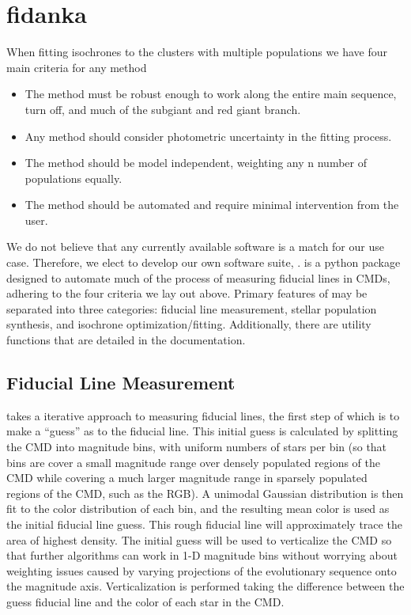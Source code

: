 \section{fidanka}\label{sec:fidanka}
When fitting isochrones to the clusters with multiple populations we have four
main criteria for any method

\begin{itemize}
  \item The method must be robust enough to work along the entire main
    sequence, turn off, and much of the subgiant and red giant branch.
	\item Any method should consider photometric uncertainty in the fitting process.
	\item The method should be model independent, weighting any n number of populations equally.
	\item The method should be automated and require minimal intervention from the user.
\end{itemize}


We do not believe that any currently available software is a match for
our use case. Therefore, we elect to develop our own software suite, \fidanka.
\fidanka is a python package designed to automate much of the process of
measuring fiducial lines in CMDs, adhering to the four criteria we lay out
above. Primary features of \fidanka may be separated into three
categories: fiducial line measurement, stellar population synthesis, and
isochrone optimization/fitting. Additionally, there are utility functions that
are detailed in the \fidanka documentation.

\subsection{Fiducial Line Measurement}
\fidanka takes a iterative approach to measuring fiducial lines, the first step
of which is to make a ``guess'' as to the fiducial line. This initial guess
is calculated by splitting the CMD into magnitude bins, with uniform numbers of
stars per bin (so that bins are cover a small magnitude range over densely
populated regions of the CMD while covering a much larger magnitude range in
sparsely populated regions of the CMD, such as the RGB). A unimodal Gaussian
distribution is then fit to the color distribution of each bin, and the
resulting mean color is used as the initial fiducial line guess. This rough
fiducial line will approximately trace the area of highest density. The initial
guess will be used to verticalize the CMD so that further algorithms can work in
1-D magnitude bins without worrying about weighting issues caused by varying
projections of the evolutionary sequence onto the magnitude axis.
Verticalization is performed taking the difference between the guess fiducial
line and the color of each star in the CMD.

